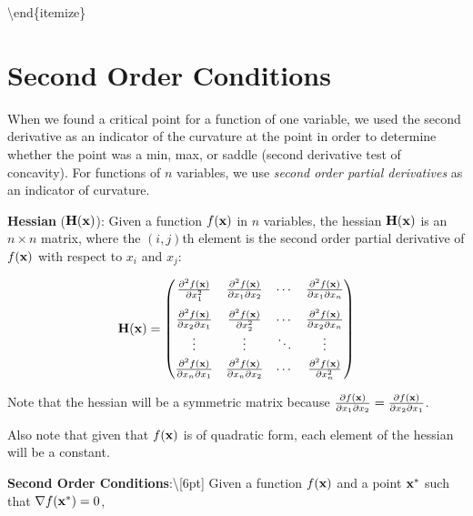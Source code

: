 \documentclass[]{book}
\newcommand{\fx}{f({\bf x})}
\theoremstyle{definition}
\theoremstyle{definition}
\theoremstyle{definition}
\theoremstyle{remark}
\begin{document}
\textbackslash{}end\{itemize\}

\section{Second Order Conditions}\label{second-order-conditions}

When we found a critical point for a function of one variable, we used
the second derivative as an indicator of the curvature at the point in
order to determine whether the point was a min, max, or saddle (second
derivative test of concavity). For functions of \(n\) variables, we use
\textit{second order partial derivatives} as an indicator of curvature.

\textbf{Hessian} (\({\bf H(x)}\)): Given a function \(f({\bf x})\) in
\(n\) variables, the hessian \({\bf H(x)}\) is an \(n\times n\) matrix,
where the \((i,j)\)th element is the second order partial derivative of
\(f({\bf x})\) with respect to \(x_i\) and \(x_j\):

\[{\bf H(x)}=\begin{pmatrix}
\frac{\partial^2 \fx}{\partial x_1^2}&\frac{\partial^2\fx}{\partial x_1 \partial x_2}&
\cdots & \frac{\partial^2 \fx}{\partial x_1 \partial x_n}\\[9pt]
\frac{\partial^2 \fx}{\partial x_2 \partial x_1}&\frac{\partial^2\fx}{\partial x_2^2}&
\cdots & \frac{\partial^2 \fx}{\partial x_2 \partial x_n}\\
\vdots & \vdots & \ddots & \vdots \\[3pt]
\frac{\partial^2 \fx}{\partial x_n \partial x_1}&\frac{\partial^2\fx}{\partial x_n \partial x_2}&
\cdots & \frac{\partial^2 \fx}{\partial x_n^2}\end{pmatrix}\]

Note that the hessian will be a symmetric matrix because
\(\frac{\partial \fx}{\partial x_1\partial x_2} = \frac{\partial \fx}{\partial x_2\partial x_1}\).

Also note that given that \(\fx\) is of quadratic form, each element of
the hessian will be a constant.

\smallskip

\textbf{Second Order Conditions}:\textbackslash{}{[}6pt{]} Given a
function \(\fx\) and a point \({\bf x}^*\) such that
\(\nabla f({\bf x}^*)=0\),
\end{document}
